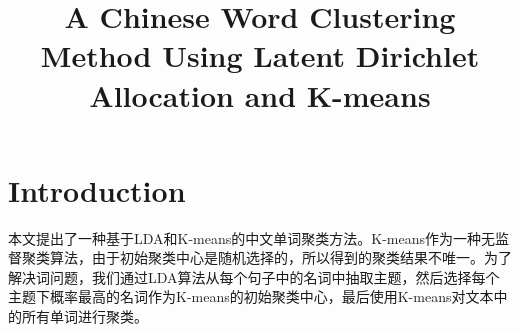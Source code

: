\documentclass{article}
\begin{document}
\title{A Chinese Word Clustering Method Using Latent Dirichlet Allocation and K-means}
\date{}
\maketitle

\section{Introduction}
本文提出了一种基于LDA和K-means的中文单词聚类方法。K-means作为一种无监督聚类算法，由于初始聚类中心是随机选择的，所以得到的聚类结果不唯一。为了解决词问题，我们通过LDA算法从每个句子中的名词中抽取主题，然后选择每个主题下概率最高的名词作为K-means的初始聚类中心，最后使用K-means对文本中的所有单词进行聚类。
\end{document}
